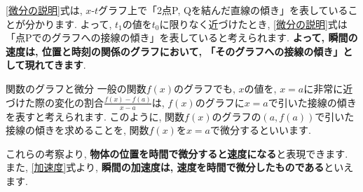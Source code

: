 \documentclass[11pt,dvipdfmx]{jsarticle}
\numberwithin{equation}{section} %
\begin{document}
\eqref{微分の説明}式は, $x$-$t$グラフ上で「2点P, Qを結んだ直線の傾き」を表していることが分かります. よって, $t_{1}$の値を$t_{0}$に限りなく近づけたとき, \eqref{微分の説明}式は「点Pでのグラフへの接線の傾き」を表していると考えられます. \textbf{よって, 瞬間の速度は, 位置と時刻の関係のグラフにおいて, 「そのグラフへの接線の傾き」として現れてきます}.
\begin{freebox}{関数のグラフと微分}
    一般の関数$f(x)$のグラフでも, $x$の値を, $x=a$に非常に近づけた際の変化の割合$\frac{f(x) - f(a)}{x-a}$は, $f(x)$のグラフに$x = a$で引いた接線の傾きを表すと考えられます. このように, 関数$f(x)$のグラフの$(a, f(a))$で引いた接線の傾きを求めることを, 関数$f(x)$を$x = a$で微分するといいます. 
    \begin{center}
\end{center}
\end{freebox}
これらの考察より, \textbf{物体の位置を時間で微分すると速度になる}と表現できます. また, \eqref{加速度}式より, \textbf{瞬間の加速度は, 速度を時間で微分したものである}といえます. 
\end{document}
